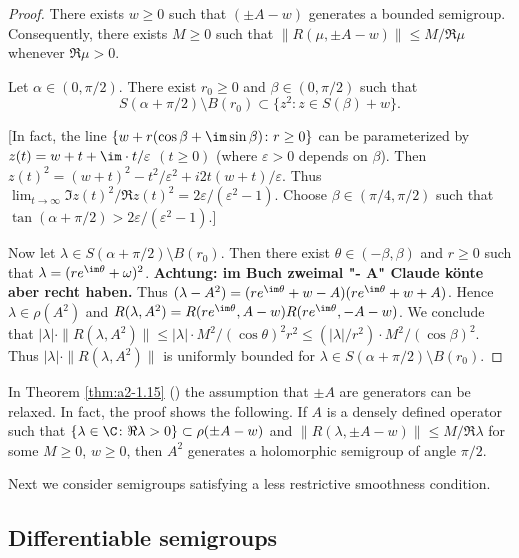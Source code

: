 \begin{proof}
There exists $w \geq 0$ such that $(\pm A - w)$ generates a bounded semigroup.
Consequently, there exists $M \geq 0$ such that $\|R(\mu,\pm A - w)\| \leq M/\Re\mu$ whenever $\Re\mu > 0$.

Let $\alpha \in (0,\pi/2)$.
There exist $r_0 \geq 0$ and $\beta \in (0,\pi/2)$ such that
\[
    S(\alpha+\pi/2)\setminus B(r_{0}) \subset \{ z^2 \colon z \in S(\beta) + w \}.
\]

[In fact, the line $\{w + r(\cos\beta + \im \sin\beta) \colon r \geq 0\}$ can be parameterized by $z(t) = w + t + \im\cdot t/\varepsilon$ $(t \geq 0)$ 
(where $\varepsilon > 0$ depends on $\beta$).
Then $z(t)^2 = (w + t)^2 - t^2/\varepsilon^2 + i2t(w+t)/\varepsilon$.
Thus $\lim_{t \to \infty} \Im z(t)^2/\Re z(t)^2 = 2\varepsilon/(\varepsilon^2-1)$.
Choose $\beta \in (\pi/4,\pi/2)$ such that $\tan(\alpha + \pi/2) > 2\varepsilon/(\varepsilon^2-1)$.]

Now let $\lambda \in S(\alpha+\pi/2)\setminus B(r_{0})$.
Then there exist $\theta \in (-\beta,\beta)$ 
and $r \geq 0$
such that $\lambda = (re^{\im\theta}+\omega)^2$.
\textbf{ Achtung: im Buch zweimal "- A" Claude könte aber recht haben.}
Thus $(\lambda-A^2) = (re^{\im\theta}+w - A)(re^{\im\theta}+w + A)$.
Hence $\lambda \in \rho(A^2)$ and $R(\lambda,A^2) = R(re^{\im\theta},A-w)R(re^{\im\theta},-A-w)$.
We conclude that 
$|\lambda| \cdot \|R(\lambda,A^2)\| \leq |\lambda| \cdot M^2/(\cos\theta)^2r^2 \leq (|\lambda|/r^2)\cdot M^2/(\cos\beta)^2$.
Thus $|\lambda| \cdot \|R(\lambda,A^2)\|$ is uniformly bounded for $\lambda \in S(\alpha+\pi/2) \setminus B(r_0)$.
\end{proof}
\begin{remark*}\label{rem:a2-1.7-kgk}
In Theorem  \ref{thm:a2-1.15} ()
the assumption that $\pm A$ are generators can be relaxed.
In fact, the proof shows the following.
If $A$ is a densely defined operator such that 
$\{\lambda \in \C \colon \Re\lambda > 0\} \subset \rho(\pm A - w)$ and 
$\|R(\lambda,\pm A - w)\| \leq M/\Re\lambda$ for some $M \geq 0$, $w \geq 0$, then $A^2$ generates a holomorphic semigroup of angle $\pi/2$.
\end{remark*}

Next we consider semigroups satisfying a less restrictive smoothness condition.

\subsection{Differentiable semigroups} \label{subsec:a2-1.se5}


